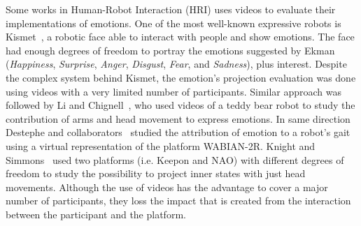 Some works in Human-Robot Interaction (HRI) uses videos to evaluate their implementations of emotions. One of the most well-known expressive robots is Kismet~\cite{Breazeal2002}, a robotic face able to interact with people and show emotions. The face had enough degrees of freedom to portray the emotions suggested by Ekman~\cite{Ekman2004} (\textit{Happiness}, \textit{Surprise}, \textit{Anger}, \textit{Disgust}, \textit{Fear}, and \textit{Sadness}), plus interest. 
Despite the complex system behind Kismet, the emotion's projection evaluation was done using videos with a very limited number of participants. Similar approach was followed by Li and Chignell~\cite{Li2011}, who used videos of a teddy bear robot to study the contribution of arms and head movement to express emotions. In same direction Destephe and collaborators~\cite{Destephe2013} studied the attribution of emotion to a robot's gait using a virtual representation of the platform WABIAN-2R. Knight and Simmons~\cite{knight2016} used two platforms (i.e. Keepon and NAO) with different degrees of freedom to study the possibility to project inner states with just head movements. Although the use of videos has the advantage to cover a major number of participants, they loss the impact that is created from the interaction between the participant and the platform.

